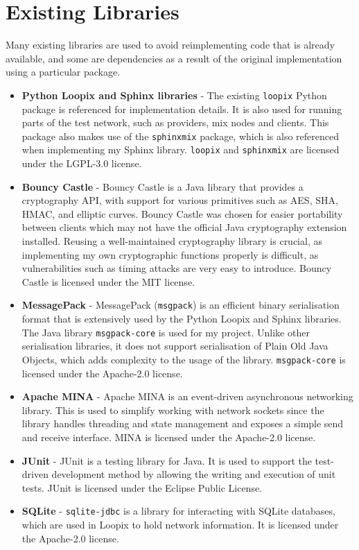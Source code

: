 \documentclass[final,dissertation.tex]{subfiles}
\begin{document}
\section{Existing Libraries}

Many existing libraries are used to avoid reimplementing code that is already available, and some are dependencies as a result of the original implementation using a particular package.

\begin{itemize}
	\item \textbf{Python Loopix and Sphinx libraries} - The existing \verb|loopix| Python package is referenced for implementation details. It is also used for running parts of the test network, such as providers, mix nodes and clients. This package also makes use of the \verb|sphinxmix| package, which is also referenced when implementing my Sphinx library. \verb|loopix| and \verb|sphinxmix| are licensed under the LGPL-3.0 license.
	\item \textbf{Bouncy Castle} - Bouncy Castle is a Java library that provides a cryptography API, with support for various primitives such as AES, SHA, HMAC, and elliptic curves. Bouncy Castle was chosen for easier portability between clients which may not have the official Java cryptography extension installed. Reusing a well-maintained cryptography library is crucial, as implementing my own cryptographic functions properly is difficult, as vulnerabilities such as timing attacks are very easy to introduce. Bouncy Castle is licensed under the MIT license.
	\item \textbf{MessagePack} - MessagePack (\verb|msgpack|) is an efficient binary serialisation format that is extensively used by the Python Loopix and Sphinx libraries. The Java library \verb|msgpack-core| is used for my project. Unlike other serialisation libraries, it does not support serialisation of Plain Old Java Objects, which adds complexity to the usage of the library. \verb|msgpack-core| is licensed under the Apache-2.0 license.
	\item \textbf{Apache MINA} - Apache MINA is an event-driven asynchronous networking library. This is used to simplify working with network sockets since the library handles threading and state management and exposes a simple send and receive interface. MINA is licensed under the Apache-2.0 license.
	\item \textbf{JUnit} - JUnit is a testing library for Java. It is used to support the test-driven development method by allowing the writing and execution of unit tests. JUnit is licensed under the Eclipse Public License.
	\item \textbf{SQLite} - \verb|sqlite-jdbc| is a library for interacting with SQLite databases, which are used in Loopix to hold network information. It is licensed under the Apache-2.0 license.
\end{itemize}
\end{document}
